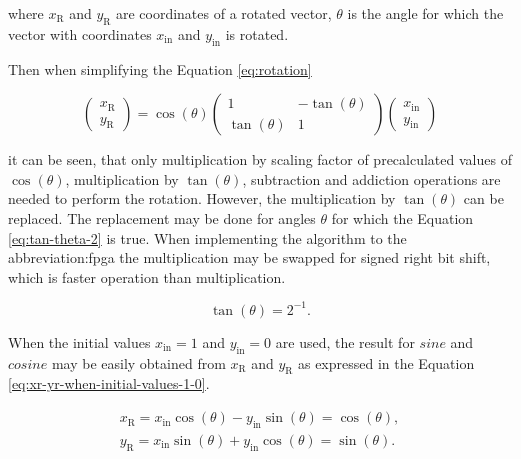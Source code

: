 \documentclass[a4paper, twoside, 11pt]{article}
\begin{document}
        where $x_\text{R}$ and $y_\text{R}$ are coordinates of a rotated vector, $\theta$ is the angle for which the vector with coordinates $x_\text{in}$ and $y_\text{in}$ is rotated.\par
        Then when simplifying the Equation \ref{eq:rotation}


        \begin{equation}\label{eq:rotation-simplifying}
             \begin{pmatrix}
                 x_\text{R}\\
                 y_\text{R}
             \end{pmatrix}
             = \cos (\theta)
             \begin{pmatrix}
                 1 & -\tan (\theta)\\
                 \tan (\theta) & 1
             \end{pmatrix}
             \begin{pmatrix}
                 x_\text{in}\\
                 y_\text{in}
             \end{pmatrix}
        \end{equation}

        \noindent it can be seen, that only multiplication by scaling factor of precalculated values of $\cos (\theta)$, multiplication by $\tan (\theta)$, subtraction and addiction operations are needed to perform the rotation. However, the multiplication by $\tan (\theta)$ can be replaced. The replacement may be done for angles $\theta$ for which the Equation \ref{eq:tan-theta-2} is true. When implementing the algorithm to the \gls{abbreviation:fpga} the multiplication may be swapped for signed right bit shift, which is faster operation than multiplication.

        \begin{equation}\label{eq:tan-theta-2}
            \tan (\theta) = 2^{-1}.
        \end{equation}
        \par
        When the initial values $x_\text{in} = 1$ and $y_\text{in} = 0$ are used, the result for $sine$ and $cosine$ may be easily obtained from $x_\text{R}$ and $y_\text{R}$ as expressed in the Equation \ref{eq:xr-yr-when-initial-values-1-0}.

        \begin{equation}\label{eq:xr-yr-when-initial-values-1-0}
            \begin{gathered}
             x_\text{R} = x_\text{in} \cos (\theta) - y_\text{in} \sin (\theta) = \cos (\theta),\\
             y_\text{R} = x_\text{in} \sin (\theta) + y_\text{in} \cos (\theta) = \sin (\theta).
            \end{gathered}
        \end{equation}
\end{document}
